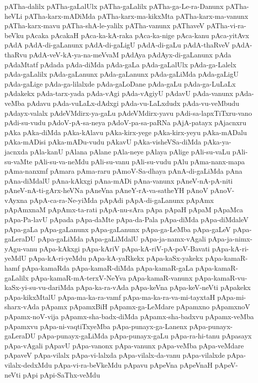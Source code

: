 {pATha-dalilx
pATha-gaLalUlx
pATha-gaLalilx
pATha-ga-Le-ra-Danunx
pATha-heVLi
pATha-karx-mADiMda
pATha-karx-ma-kikxMta
pATha-karx-ma-vanunx
pATha-karx-mavu
pATha-shA-le-yalilx
pATha-vanunx
pAThaveV
pATha-vi-ra-beVku
pAcaka
pAcakaH
pAca-ka-kA-raka
pAca-ka-nige
pAca-kanu
pAca-yitAvx
pAdA
pAdA-di-gaLanunx
pAdA-di-gaLigU
pAdA-di-gaLu
pAdA-thaRveV
pAdA-thaRvu
pAdA-veV-kA-ya-na-meVvaM
pAdAya
pAdAyx-di-gaLanunx
pAda
pAdaMtatf
pAdada
pAda-diMda
pAda-gaLa
pAda-gaLalUlx
pAda-ga-Lalelx
pAda-gaLalilx
pAda-gaLanunx
pAda-gaLanunx
pAda-gaLiMda
pAda-gaLigU
pAda-gaLige
pAda-ga-lilalxde
pAda-gaLoDane
pAda-gaLu
pAda-ga-LuLaLx
pAdakekx
pAda-tarx-yada
pAda-vAgi
pAda-vAgiyU
pAdavU
pAda-vanunx
pAda-veMba
pAdavu
pAda-vuLaLx-dAdxgi
pAda-vu-LaLxdudx
pAda-vu-veMbudu
pAdayx-valalx
pAdeVMdirx-ya-gaLu
pAdeVMdirx-yavu
pAdi-sa-lapxTiTxru-vano
pAdi-su-vudu
pAdoV-pA-sa-neya
pAdoV-pa-sa-paRNa
pAjA-patayx
pAjacnxru
pAka
pAka-diMda
pAka-kAlavu
pAka-kirx-yege
pAka-kirx-yeyu
pAka-mADalu
pAka-mADisi
pAka-mADu-vudu
pAkavU
pAka-visheVSa-diMda
pAka-ya-jacnxda
pAla-kanU
pAlana
pAlane
pAla-neye
pAlaya
pAlige
pAli-su-vaLu
pAli-su-vaMte
pAli-su-va-neMdu
pAli-su-vanu
pAli-su-vudu
pAlu
pAma-nanx-mapa
pAma-nanxmf
pAmara
pAma-raru
pAmoV-Sa-dhaya
pAnA-di-gaLiMda
pAna
pAna-diMdalU
pAna-kAkxgi
pAna-mADi
pAna-vanunx
pAneV-nA-pA-niti
pAneV-nA-ti-gArx-heVNa
pAneVna
pAneY-rA-va-satheYH
pAnoV
pAnoV-vAyxna
pApA-ca-ra-Ne-yiMda
pApAdi
pApA-di-gaLanunx
pApAmx
pApAmxnaM
pApAmx-ta-rati
pApA-nu-sAra
pApa
pApaH
pApaM
pApaMca
pApa-Pa-lavU
pApada
pApa-daMte
pApa-da-Pala
pApa-diMda
pApa-diMdaleV
pApa-gaLa
pApa-gaLanunx
pApa-gaLanunx
pApa-ga-LeMba
pApa-gaLeV
pApa-gaLeraDU
pApa-gaLiMda
pApa-gaLiMdalU
pApa-ja-namx-vAgali
pApa-ja-nimx-yAgu-vanu
pApa-kAkxgi
pApa-kAriV
pApa-kA-riV-pA-poV-Bavati
pApa-kA-ri-yeMdU
pApa-kA-ri-yeMdu
pApa-kA-yaRkekx
pApa-kaSx-yakekx
pApa-kamaR-hamf
pApa-kamaRda
pApa-kamaR-diMda
pApa-kamaR-gaLa
pApa-kamaR-gaLalilx
pApa-kamaR-mA-terxV-NeYva
pApa-kamaR-vanunx
pApa-kamaR-vu-kaSx-yi-su-vu-dariMda
pApa-ka-ra-vAda
pApa-keVna
pApa-keV-neVti
pApakekx
pApa-kikxMtalU
pApa-ma-ka-ra-vamf
pApa-ma-ka-ra-va-mi-tayxtaH
pApa-mi-sharx-vAda
pApamx
pApamxBiH
pApamx-ga-LeMdare
pApamxno
pApamxnoV
pApamx-noV-vija
pApamx-sha-badx-diMda
pApamx-sha-badxvu
pApamx-veMba
pApamxvu
pApa-ni-vaqtiTxyeMba
pApa-punayx-ga-Lanenx
pApa-punayx-gaLeraDU
pApa-punayx-gaLiMda
pApa-punayx-gaLu
pApa-ra-hi-tanu
pApasayx
pApa-vAgali
pApavU
pApa-vanonx
pApa-vanunx
pApa-veMba
pApa-veMdare
pApaveV
pApa-vilalx
pApa-vi-lalxda
pApa-vilalx-da-vanu
pApa-vilalxde
pApa-vilalx-dedxMdu
pApa-vi-ra-beVkeMdu
pApavu
pApeVna
pApeVnaH
pApeV-neVti
pApi
pApi-SaThx-veMdu
}
